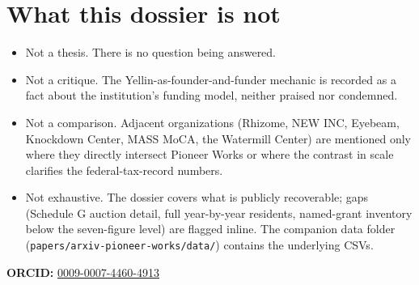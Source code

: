 \documentclass[10pt,letterpaper,twocolumn]{article}
\begin{document}
\section{What this dossier is not}

\begin{itemize}
  \item Not a thesis. There is no question being answered.
  \item Not a critique. The Yellin-as-founder-and-funder mechanic is recorded as a fact about the institution's funding model, neither praised nor condemned.
  \item Not a comparison. Adjacent organizations (Rhizome, NEW INC, Eyebeam, Knockdown Center, MASS MoCA, the Watermill Center) are mentioned only where they directly intersect Pioneer Works or where the contrast in scale clarifies the federal-tax-record numbers.
  \item Not exhaustive. The dossier covers what is publicly recoverable; gaps (Schedule G auction detail, full year-by-year residents, named-grant inventory below the seven-figure level) are flagged inline. The companion data folder (\texttt{papers/arxiv-pioneer-works/data/}) contains the underlying CSVs.
\end{itemize}

\vspace{0.5em}
\noindent\textbf{ORCID:} \href{https://orcid.org/0009-0007-4460-4913}{0009-0007-4460-4913}



\end{document}
